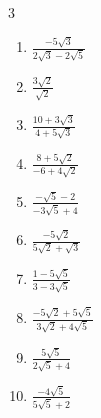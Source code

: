\begin{multicols}{3}
\begin{enumerate}

\columnbreak %

  \item $\displaystyle \frac{-5\sqrt{3}}{2\sqrt{3}-2\sqrt{5}}$


  \item $\displaystyle \frac{3\sqrt{2}}{\sqrt{2}}$

        \phantom{$\displaystyle =3$}

  \item $\displaystyle \frac{10+3\sqrt{3}}{4+5\sqrt{3}}$


  \item $\displaystyle \frac{8+5\sqrt{2}}{-6+4\sqrt{2}}$


  \item $\displaystyle \frac{-\sqrt{5}-2}{-3\sqrt{5}+4}$


\columnbreak %

\resetques

  \item $\displaystyle \frac{-5\sqrt{2}}{5\sqrt{2}+\sqrt{3}}$


  \item $\displaystyle \frac{1-5\sqrt{5}}{3-3\sqrt{5}}$


  \item $\displaystyle \frac{-5\sqrt{2}+5\sqrt{5}}{3\sqrt{2}+4\sqrt{5}}$


  \item $\displaystyle \frac{5\sqrt{5}}{2\sqrt{5}+4}$


  \item $\displaystyle \frac{-4\sqrt{5}}{5\sqrt{5}+2}$



\end{enumerate}
\end{multicols}

